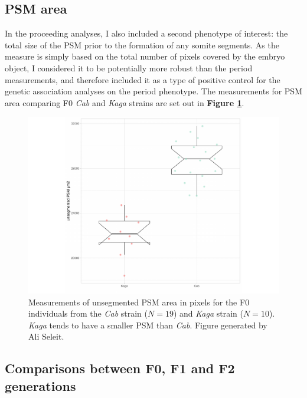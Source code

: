 \documentclass[
]{book}
\begin{document}
\hypertarget{psm-area}{%
\subsection{PSM area}\label{psm-area}}

In the proceeding analyses, I also included a second phenotype of interest: the total size of the PSM prior to the formation of any somite segments. As the measure is simply based on the total number of pixels covered by the embryo object, I considered it to be potentially more robust than the period measurements, and therefore included it as a type of positive control for the genetic association analyses on the period phenotype. The measurements for PSM area comparing F0 \emph{Cab} and \emph{Kaga} strains are set out in \textbf{Figure \ref{fig:ali-psm-F0}}.



\begin{figure}
\includegraphics[width=1\linewidth]{figs/somites/ali_PSM_Cab_Kaga} \caption{Measurements of unsegmented PSM area in pixels for the F0 individuals from the \emph{Cab} strain (\(N = 19\)) and \emph{Kaga} strain (\(N = 10\)). \emph{Kaga} tends to have a smaller PSM than \emph{Cab}. Figure generated by Ali Seleit.}\label{fig:ali-psm-F0}
\end{figure}

\hypertarget{comparisons-between-f0-f1-and-f2-generations}{%
\subsection{Comparisons between F0, F1 and F2 generations}\label{comparisons-between-f0-f1-and-f2-generations}}
\end{document}
